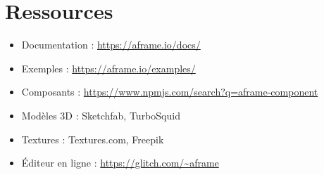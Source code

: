 \documentclass[12pt]{article}
\begin{document}
\section{Ressources}
\begin{itemize}
    \item Documentation : \url{https://aframe.io/docs/}
    \item Exemples : \url{https://aframe.io/examples/}
    \item Composants : \url{https://www.npmjs.com/search?q=aframe-component}
    \item Modèles 3D : Sketchfab, TurboSquid
    \item Textures : Textures.com, Freepik
    \item Éditeur en ligne : \url{https://glitch.com/~aframe}
\end{itemize}
\end{document}
